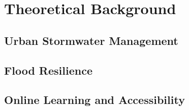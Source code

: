 \chapter{Theoretical Background}

\section{Urban Stormwater Management}

\section{Flood Resilience}

\section{Online Learning and Accessibility}
